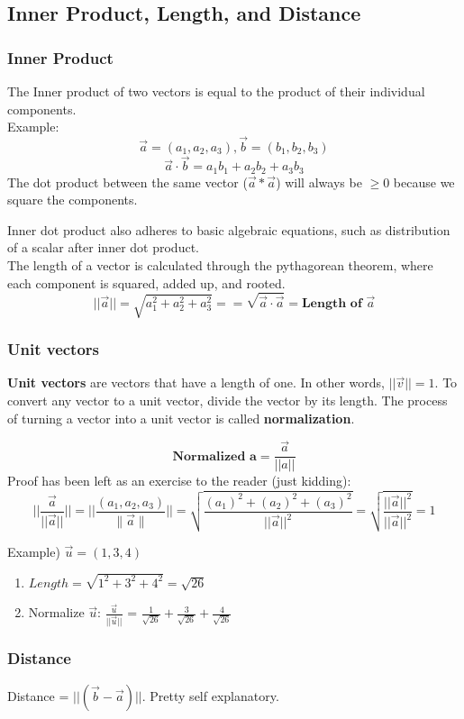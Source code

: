 \documentclass{article}
\newcommand{\lnorm}{\biggl| \biggl|}
\newcommand{\rnorm}{\biggr| \biggr|}
\begin{document}
\subsection{Inner Product, Length, and Distance}
\subsubsection{Inner Product}
The Inner product of two vectors is equal to the product of their individual components.
\\ Example:
$$ \vec{a} = (a_1,a_2,a_3), \vec{b}=(b_1,b_2,b_3) $$
$$ \vec{a}\cdot \vec{b} = a_1b_1 + a_2b_2 + a_3b_3 $$
The dot product between the same vector ($\vec{a} * \vec{a}$) will always be $\geq 0$ because we square the components.

Inner dot product also adheres to basic algebraic equations, such as distribution of a scalar after inner dot product. \\
The length of a vector is calculated through the pythagorean theorem, where each component is squared, added up, and rooted. 
$$ ||\vec{a}|| = \sqrt{a_1^2 + a_2^2 + a_3^2} = = \sqrt{\vec{a}\cdot \vec{a}} = \textbf{Length of }\vec{a}$$
\subsubsection{Unit vectors}
\textbf{Unit vectors} are vectors that have a length of one. In other words, $||\vec{v}|| = 1$. To convert
any vector to a unit vector, divide the vector by its length. The process of turning a vector into a unit vector
is called \textbf{normalization}.

$$ \textbf{Normalized a} = \frac{\vec{a}}{||a||}$$
Proof has been left as an exercise to the reader (just kidding):
  $$ \lnorm \frac{\vec{a}}{||\vec{a}||} \rnorm = \lnorm \frac{(a_1,a_2,a_3)}{\|\vec{a}\|} \rnorm = 
	\sqrt{\frac{(a_1)^2 + (a_2)^2 + (a_3)^2}{||\vec{a}||^2}} = 
	\sqrt{\frac{||\vec{a}||^2}{||\vec{a}||^2}} = 1$$

	Example) $\vec{u} = (1,3,4)$
	\begin{enumerate}
	  \item $Length = \sqrt{1^2 + 3^2 + 4^2} = \sqrt{26}$
	  \item Normalize $\vec{u}$: $\frac{\vec{u}}{||\vec{u}||}$ = 
		$\frac{1}{\sqrt{26}} + \frac{3}{\sqrt{26}} +\frac{4}{\sqrt{26}}$
	\end{enumerate}
	\subsubsection{Distance}
    Distance = $\lnorm (\vec{b} - \vec{a}) \rnorm $. Pretty self explanatory.
\end{document}
